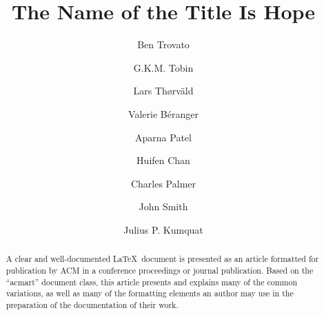\documentclass[acmsmall,screen,anonymous,review]{acmart}
\begin{document}
\title{The Name of the Title Is Hope}

\author{Ben Trovato}
\author{G.K.M. Tobin}
\correspondingauthor
\authornotemark[1]

\author{Lars Th{\o}rv{\"a}ld}

\author{Valerie B\'eranger}

\author{Aparna Patel}

\author{Huifen Chan}

\author{Charles Palmer}

\author{John Smith}

\author{Julius P. Kumquat}
\correspondingauthor
{}

\renewcommand{\shortauthors}{Trovato et al.}

\begin{abstract}
  A clear and well-documented \LaTeX\ document is presented as an
  article formatted for publication by ACM in a conference proceedings
  or journal publication. Based on the ``acmart'' document class, this
  article presents and explains many of the common variations, as well
  as many of the formatting elements an author may use in the
  preparation of the documentation of their work.
\end{abstract}
\end{document}
